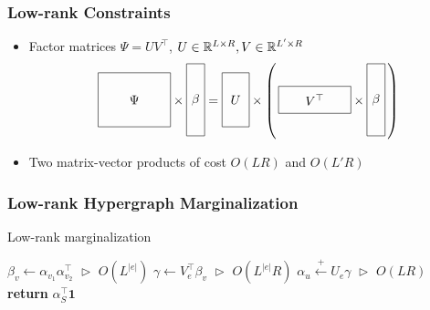 \documentclass{beamer}
\begin{document}
\begin{frame}
\frametitle{Low-rank Constraints}
\begin{itemize}
\item Factor matrices $\Psi=UV^\top$,
$U\in\mathbb{R}^{L \times R},V\in\mathbb{R}^{L'\times R}$
\[
\vcenter{\hbox{\begin{tikzpicture}[baseline=-0.5ex]
    \draw (0,0) rectangle (2,1.5) node[pos=.5] {$\Psi$};
\end{tikzpicture}}}
\times
\vcenter{\hbox{\begin{tikzpicture}[baseline=-0.5ex]
    \draw (0,0) rectangle (.5,2) node[pos=.5] {$\beta$};
\end{tikzpicture}}}
=
\vcenter{\hbox{\begin{tikzpicture}[baseline=-0.5ex]
    \draw (0,0) rectangle (.75,1.5) node[pos=.5] {$U$};
\end{tikzpicture}}}
\times
\left(\,
\vcenter{\hbox{\begin{tikzpicture}[baseline=-0.5ex]
    \draw (0,0) rectangle (2,.75) node[pos=.5] {$V^\top$};
\end{tikzpicture}}}
\times
\vcenter{\hbox{\begin{tikzpicture}[baseline=-0.5ex]
    \draw (0,0) rectangle (.5,2) node[pos=.5] {$\beta$};
\end{tikzpicture}}}
\,\right)
\]
\item Two matrix-vector products of cost $O(LR)$ and $O(L'R)$
\end{itemize}
\end{frame}

\begin{frame}
\frametitle{Low-rank Hypergraph Marginalization}
\centering

\begin{algorithm}[H]
\caption{\label{alg:low-rank-update} Low-rank marginalization}
\begin{algorithmic} 
\STATE $\beta_v \gets \alpha_{v_1}\alpha_{v_2}^\top$
    \hfill $\vartriangleright$ $O(L^{|e|})$
\STATE $\gamma \gets V_e^\top\beta_v$
    \hfill $\vartriangleright$ $O(L^{|e|}R)$
\STATE $\alpha_u \stackrel{+}{\gets} U_e\gamma $
    \hfill $\vartriangleright$ $O(LR)$
\ENDFOR
\STATE \textbf{return} $\alpha_S^\top\mathbf{1}$
\end{algorithmic} 
\end{algorithm}

\end{frame}
\end{document}
